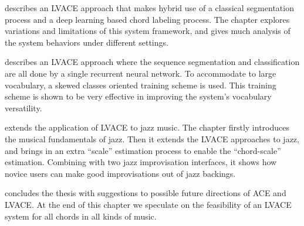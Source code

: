  describes an LVACE approach that makes hybrid use of a classical segmentation process and a deep learning based chord labeling process. The chapter explores variations and limitations of this system framework, and gives much analysis of the system behaviors under different settings.

 describes an LVACE approach where the sequence segmentation and classification are all done by a single recurrent neural network. To accommodate to large vocabulary, a skewed classes oriented training scheme is used. This training scheme is shown to be very effective in improving the system's vocabulary versatility.

 extends the application of LVACE to jazz music. The chapter firstly introduces the musical fundamentals of jazz. Then it extends the LVACE approaches to jazz, and brings in an extra ``scale'' estimation process to enable the ``chord-scale'' estimation. Combining with two jazz improvisation interfaces, it shows how novice users can make good improvisations out of jazz backings.

 concludes the thesis with suggestions to possible future directions of ACE and LVACE. At the end of this chapter we speculate on the feasibility of an LVACE system for all chords in all kinds of music.


